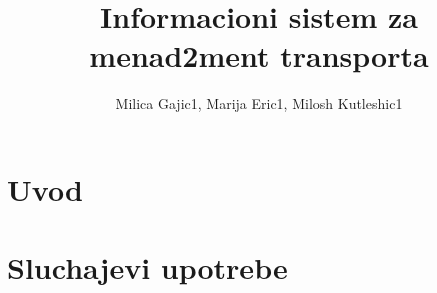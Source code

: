\documentclass{article}
\title{Informacioni sistem za menad2ment transporta}
\author{Milica Gajic1, Marija Eric1, Milosh Kutleshic1}
\begin{document}
\maketitle
\newpage


\renewcommand*\contentsname{Sadrz1aj}
\tableofcontents
\newpage

\section{Uvod}

\section{Sluchajevi upotrebe}





\end{document}

